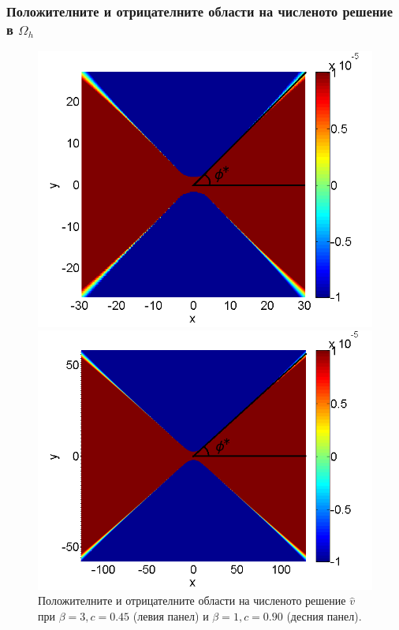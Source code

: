 \documentclass[a4paper]{article}
\theoremstyle{remark}
\begin{document}
\subsubsection{Положителните и отрицателните области на численото решение в $\Omega_h$ }
\begin{figure}[ht]
	\begin{minipage}[b]{0.46\linewidth}
		\raggedleft
		\includegraphics[width=\linewidth]{NewBoundaryCondition/PosNeg_bt3_c045.png}
	\end{minipage}	
	\begin{minipage}[b]{0.49\linewidth}
		\raggedright
		 \includegraphics[width=\linewidth]{NewBoundaryCondition/PosNeg_bt1_c090.png}
	\end{minipage}
	\caption{Положителните и отрицателните области на численото решение $\widehat v$ при $\beta = 3, c=0.45$ (левия панел) и $\beta = 1, c=0.90$ (десния панел). }
	\label{fig:posNegDom}
\end{figure}
\end{document}
